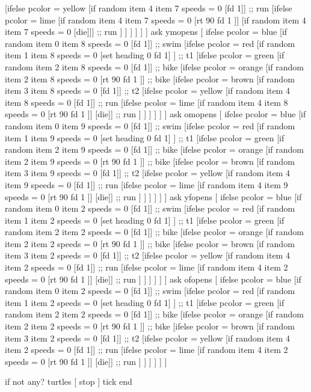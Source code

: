 \documentclass[12pt]{article}
\begin{document}
           [ifelse pcolor = yellow [if random item 4 item 7 speeds  = 0 [fd 1]] ;; run
             [ifelse pcolor = lime [if random item 4 item 7 speeds  = 0 [rt 90 fd 1 ]] 
               [if random item 4 item 7 speeds  = 0 [die]]] ;; run
             ]
           ]
         ]
       ]
     ]
    ]
  ask ymopens [
    ifelse pcolor = blue [if random item 0 item 8 speeds  = 0 [fd 1]] ;; swim
    [ifelse pcolor = red [if random item 1 item 8 speeds  = 0 [set heading 0 fd 1] ] ;; t1
     [ifelse pcolor = green [if random item 2 item 8 speeds  = 0 [fd 1]] ;; bike
       [ifelse pcolor = orange [if random item 2 item 8 speeds  = 0 [rt 90 fd 1 ]] ;; bike
         [ifelse pcolor = brown [if random item 3 item 8 speeds  = 0 [fd 1]] ;; t2
           [ifelse pcolor = yellow [if random item 4 item 8 speeds  = 0 [fd 1]] ;; run
             [ifelse pcolor = lime [if random item 4 item 8 speeds  = 0 [rt 90 fd 1 ]] [die]] ;; run
             ]
           ]
         ]
       ]
     ]
    ]
  ask omopens [
    ifelse pcolor = blue [if random item 0 item 9 speeds  = 0 [fd 1]] ;; swim
    [ifelse pcolor = red [if random item 1 item 9 speeds  = 0 [set heading 0 fd 1] ] ;; t1
     [ifelse pcolor = green [if random item 2 item 9 speeds  = 0 [fd 1]] ;; bike
       [ifelse pcolor = orange [if random item 2 item 9 speeds  = 0 [rt 90 fd 1 ]] ;; bike
         [ifelse pcolor = brown [if random item 3 item 9 speeds  = 0 [fd 1]] ;; t2
           [ifelse pcolor = yellow [if random item 4 item 9 speeds  = 0 [fd 1]] ;; run
             [ifelse pcolor = lime [if random item 4 item 9 speeds  = 0 [rt 90 fd 1 ]] [die]] ;; run
             ]
           ]
         ]
       ]
     ]
    ]
  ask yfopens [
    ifelse pcolor = blue [if random item 0 item 2 speeds  = 0 [fd 1]] ;; swim
    [ifelse pcolor = red [if random item 1 item 2 speeds  = 0 [set heading 0 fd 1] ] ;; t1
     [ifelse pcolor = green [if random item 2 item 2 speeds  = 0 [fd 1]] ;; bike
       [ifelse pcolor = orange [if random item 2 item 2 speeds  = 0 [rt 90 fd 1 ]] ;; bike
         [ifelse pcolor = brown [if random item 3 item 2 speeds  = 0 [fd 1]] ;; t2
           [ifelse pcolor = yellow [if random item 4 item 2 speeds  = 0 [fd 1]] ;; run
             [ifelse pcolor = lime [if random item 4 item 2 speeds  = 0 [rt 90 fd 1 ]] [die]] ;; run
             ]
           ]
         ]
       ]
     ]
    ]
  ask ofopens [
    ifelse pcolor = blue [if random item 0 item 2 speeds  = 0 [fd 1]] ;; swim
    [ifelse pcolor = red [if random item 1 item 2 speeds  = 0 [set heading 0 fd 1] ] ;; t1
     [ifelse pcolor = green [if random item 2 item 2 speeds  = 0 [fd 1]] ;; bike
       [ifelse pcolor = orange [if random item 2 item 2 speeds  = 0 [rt 90 fd 1 ]] ;; bike
         [ifelse pcolor = brown [if random item 3 item 2 speeds  = 0 [fd 1]] ;; t2
           [ifelse pcolor = yellow [if random item 4 item 2 speeds  = 0 [fd 1]] ;; run
             [ifelse pcolor = lime [if random item 4 item 2 speeds  = 0 [rt 90 fd 1 ]] [die]] ;; run
             ]
           ]
         ]
       ]
     ]
    ]

  if not any? turtles [ stop ]
  tick
end
\end{document}
